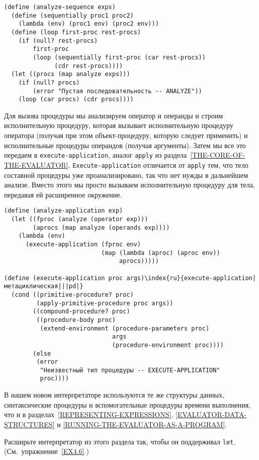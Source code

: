 \begin{Verbatim}[fontsize=\small]
(define (analyze-sequence exps)
  (define (sequentially proc1 proc2)
    (lambda (env) (proc1 env) (proc2 env)))
  (define (loop first-proc rest-procs)
    (if (null? rest-procs)
        first-proc
        (loop (sequentially first-proc (car rest-procs))
              (cdr rest-procs))))
  (let ((procs (map analyze exps)))
    (if (null? procs)
        (error "Пустая последовательность -- ANALYZE"))
    (loop (car procs) (cdr procs))))
\end{Verbatim}

Для вызова процедуры мы анализируем оператор и операнды и
строим исполнительную процедуру, которая вызывает исполнительную процедуру
оператора (получая при этом объект-процедуру, которую следует
применить) и исполнительные процедуры операндов (получая аргументы).
Затем мы все это передаем в {\tt execute-application}, аналог
{\tt apply} из раздела~\ref{THE-CORE-OF-THE-EVALUATOR}. 
{\tt Execute-application} отличается от {\tt apply} тем,
что тело составной процедуры уже проанализировано, так что нет нужды в
дальнейшем анализе.  Вместо этого мы просто вызываем исполнительную
процедуру для тела, передавая ей расширенное окружение.

\begin{Verbatim}[fontsize=\small]
(define (analyze-application exp)
  (let ((fproc (analyze (operator exp)))
        (aprocs (map analyze (operands exp))))
    (lambda (env)
      (execute-application (fproc env)
                           (map (lambda (aproc) (aproc env))
                                aprocs)))))

(define (execute-application proc args)\index{ru}{execute-application|метациклическая|||pd|}
  (cond ((primitive-procedure? proc)
         (apply-primitive-procedure proc args))
        ((compound-procedure? proc)
         ((procedure-body proc)
          (extend-environment (procedure-parameters proc)
                              args
                              (procedure-environment proc))))
        (else
         (error
          "Неизвестный тип процедуры -- EXECUTE-APPLICATION"
          proc))))
\end{Verbatim}

В нашем новом интерпретаторе используются те же структуры
данных, синтаксические процедуры и вспомогательные процедуры времени
выполнения, что и в 
разделах~\ref{REPRESENTING-EXPRESSIONS},
\ref{EVALUATOR-DATA-STRUCTURES} и
\ref{RUNNING-THE-EVALUATOR-AS-A-PROGRAM}.

\begin{exercise}{4.22}%
\label{EX4.22}%
Расширьте интерпретатор из этого 
раздела так, чтобы он
поддерживал {\tt let}. (См.~уп\-раж\-нение~\ref{EX4.6}.)
\end{exercise}

